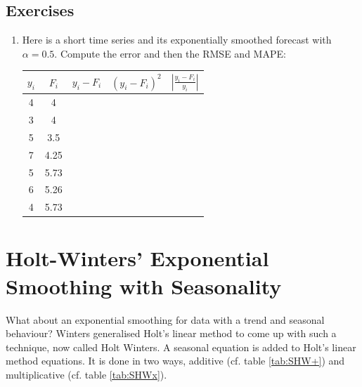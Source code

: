 \documentclass[a4paper,11pt,oneside,onecolumn]{book}
\begin{document}
\section{Exercises}

\begin{enumerate}
 \item Here is a short time series and its
exponentially smoothed forecast with $\alpha = 0.5$. Compute the
error and then the RMSE and MAPE:

\begin{center}
\begin{tabular}{ccccc}
$y_i$ & $F_i$ & $y_i - F_i$ & $(y_i - F_i)^2$ & $\left| \frac{y_i - F_i}{y_i} \right|$ \\ \hline 4 & 4 &  \\
3 & 4 &   \\
5 & 3.5 &  \\
7 & 4.25 &  \\
5 & 5.73 &  \\
6 & 5.26 &  \\
4 & 5.73 & \\ \hline
\end{tabular}
\end{center}

\end{enumerate}

\chapter{Holt-Winters' Exponential Smoothing with Seasonality}
\label{sec:hw:chp}


What about an exponential smoothing for data with a trend and
seasonal behaviour? Winters generalised Holt's linear method to
come up with such a technique, now called Holt Winters. A seasonal
equation is added to Holt's linear method equations. It is done in two ways, additive (cf. table \ref{tab:SHW+}) and multiplicative (cf. table \ref{tab:SHWx}). 
\end{document}
